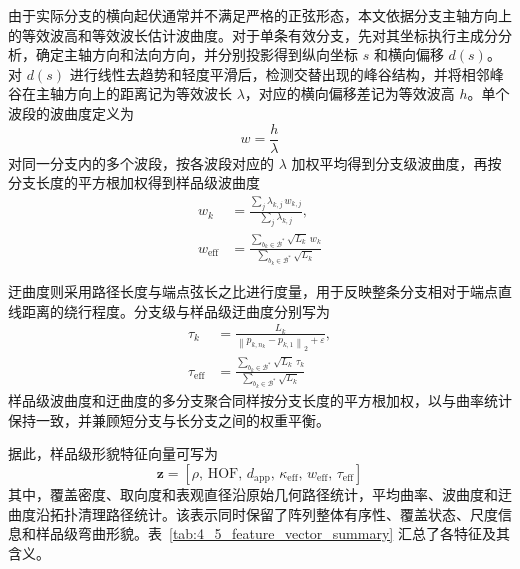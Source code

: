 由于实际分支的横向起伏通常并不满足严格的正弦形态，本文依据分支主轴方向上的等效波高和等效波长估计波曲度。对于单条有效分支，先对其坐标执行主成分分析\cite{Jolliffe2002PCA}，确定主轴方向和法向方向，并分别投影得到纵向坐标 $s$ 和横向偏移 $d(s)$。对 $d(s)$ 进行线性去趋势和轻度平滑后，检测交替出现的峰谷结构，并将相邻峰谷在主轴方向上的距离记为等效波长 $\lambda$，对应的横向偏移差记为等效波高 $h$。单个波段的波曲度定义为
\begin{equation}
    w=\frac{h}{\lambda}
\end{equation}
对同一分支内的多个波段，按各波段对应的 $\lambda$ 加权平均得到分支级波曲度，再按分支长度的平方根加权得到样品级波曲度
\begin{equation}
    \begin{aligned}
        w_k&=\frac{\sum_{j}\lambda_{k,j}\,w_{k,j}}{\sum_{j}\lambda_{k,j}},\\
        w_{\mathrm{eff}}
        &=\frac{\sum_{b_k\in\mathcal{B}^{*}}\sqrt{L_k}\,w_k}
        {\sum_{b_k\in\mathcal{B}^{*}}\sqrt{L_k}}
    \end{aligned}
\end{equation}

迂曲度则采用路径长度与端点弦长之比进行度量，用于反映整条分支相对于端点直线距离的绕行程度。分支级与样品级迂曲度分别写为
\begin{equation}
    \begin{aligned}
        \tau_k&=\frac{L_k}{\left\|p_{k,n_k}-p_{k,1}\right\|_2+\varepsilon},\\
        \tau_{\mathrm{eff}}
        &=\frac{\sum_{b_k\in\mathcal{B}^{*}}\sqrt{L_k}\,\tau_k}
        {\sum_{b_k\in\mathcal{B}^{*}}\sqrt{L_k}}
    \end{aligned}
\end{equation}
样品级波曲度和迂曲度的多分支聚合同样按分支长度的平方根加权，以与曲率统计保持一致，并兼顾短分支与长分支之间的权重平衡。

据此，样品级形貌特征向量可写为
\begin{equation}
    \mathbf{z}=
    \left[\rho,\,\mathrm{HOF},\,d_{\mathrm{app}},\,\kappa_{\mathrm{eff}},\,w_{\mathrm{eff}},\,\tau_{\mathrm{eff}}\right]
\end{equation}
其中，覆盖密度、取向度和表观直径沿原始几何路径统计，平均曲率、波曲度和迂曲度沿拓扑清理路径统计。该表示同时保留了阵列整体有序性、覆盖状态、尺度信息和样品级弯曲形貌。表~\ref{tab:4_5_feature_vector_summary} 汇总了各特征及其含义。

